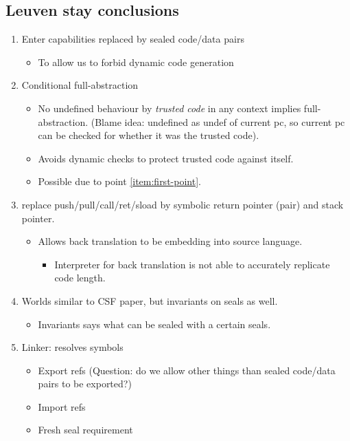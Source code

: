 \documentclass[a4paper]{article}
\begin{document}
\subsection{Leuven stay conclusions}
\begin{enumerate}
\item Enter capabilities replaced by sealed code/data pairs \label{item:first-point}
  \begin{itemize}
  \item To allow us to forbid dynamic code generation
  \end{itemize}
\item Conditional full-abstraction
  \begin{itemize}
  \item No undefined behaviour by \emph{trusted code} in any context implies full-abstraction. (Blame idea: undefined as undef of current pc, so current pc can be checked for whether it was the trusted code).
  \item Avoids dynamic checks to protect trusted code against itself.
  \item Possible due to point \ref{item:first-point}.
  \end{itemize}
\item replace push/pull/call/ret/sload by symbolic return pointer (pair) and stack pointer.
  \begin{itemize}
  \item Allows back translation to be embedding into source language.
    \begin{itemize}
    \item Interpreter for back translation is not able to accurately replicate code length.
    \end{itemize}
  \end{itemize}
\item Worlds similar to CSF paper, but invariants on seals as well.
  \begin{itemize}
  \item Invariants says what can be sealed with a certain seals.
  \end{itemize}
\item Linker: resolves symbols
  \begin{itemize}
  \item Export refs (Question: do we allow other things than sealed code/data pairs to be exported?)
  \item Import refs
  \item Fresh seal requirement
  \end{itemize}
\end{enumerate}
\end{document}
